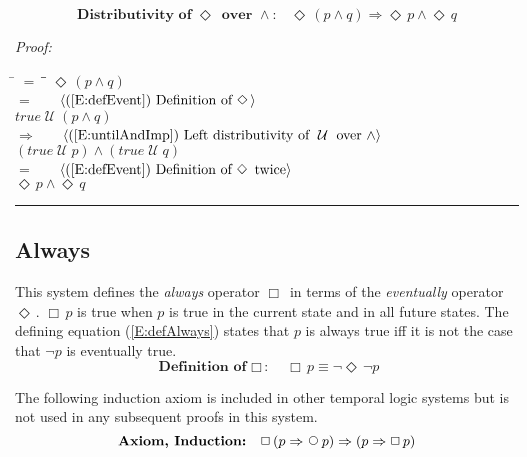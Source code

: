 \documentclass[fleqn, leqno]{article}
\newcommand{\lgap}{2pt}                             %
\newcommand{\mymathindent}{24pt}                    %
\newcommand{\impl}{\ensuremath{\Rightarrow}}        %
\newcommand{\Until}{\;\mathcal{U}\;}
\newcommand{\Next}{\;\,\text{\raisebox{3.5pt}{\circle{6}}}}
\newcommand{\Event}{\Diamond\,}
\newcommand{\Always}{\Box\,}
\newcommand{\myqed}{\rule[-.23ex]{1.2ex}{2.0ex}}
\newcommand{\myqedtab}{\hspace{388.5pt}}              %
\newcommand{\Gll} {\langle}                         %
\newcommand{\Ggg} {\rangle}                         %
\newcommand{\Hint}[1]     {\ \ \ $\Gll              \mbox{#1} \Ggg$ }   %
\begin{document}

\begin{equation}\label{E:distEventAnd}
\textbf{Distributivity of $\Event$ over $\land$:}\quad \Event(p \land q) \impl \Event p \land \Event q
\end{equation}

\emph{Proof:}
\begin{tabbing}
\hspace{\mymathindent} \= $= \;$ \= \myqedtab \= \kill
  \> \>   $\Event(p \land q)$\\[\lgap]
  \> $=$  \>  \Hint{(\ref{E:defEvent}) Definition of $\Event$}\\[\lgap]
  \> \>   $true \Until (p \land q)$\\[\lgap]
  \> $\impl$  \>  \Hint{(\ref{E:untilAndImp}) Left distributivity of $\Until$ over $\land$}\\[\lgap]
  \> \>   $(true \Until p) \land (true \Until q)$\\[\lgap]
  \> $=$  \>  \Hint{(\ref{E:defEvent}) Definition of $\Event$ twice}\\[\lgap]
  \> \>   $\Event p \land \Event q$ \> \myqed
\end{tabbing}

\subsection{Always}

This system defines the \textit{always} operator $\Always$ in terms of the \textit{eventually} operator $\Event$.
$\Always p$ is true when $p$ is true in the current state and in all future states.
The defining equation (\ref{E:defAlways}) states that $p$ is always true iff it is not the case that $\neg p$ is eventually true.
\begin{equation}\label{E:defAlways}
\textbf{Definition of $\Always$:}\quad \Always p \equiv \neg\Event\neg p
\end{equation}

The following induction axiom is included in other temporal logic systems but is not used in any subsequent proofs in this system.
\begin{equation}\label{E:induction}
\textbf{Axiom, Induction:}\quad \Always (p \impl \Next p) \impl (p \impl \Always p)
\end{equation}
\end{document}
